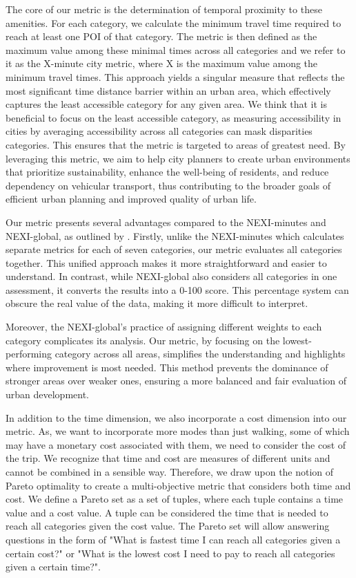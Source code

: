 The core of our metric is the determination of temporal proximity to these amenities. 
For each category, we calculate the minimum travel time required to reach at least one POI of that category. 
The metric is then defined as the maximum value among these minimal times across all categories and we refer to it as the X-minute city metric, where X is the maximum value among the minimum travel times.
This approach yields a singular measure that reflects the most significant time distance barrier within an urban area, which effectively captures the least accessible category for any given area.
We think that it is beneficial to focus on the least accessible category, as measuring accessibility in cities by averaging accessibility across all categories can mask disparities categories. 
This ensures that the metric is targeted to areas of greatest need. 
By leveraging this metric, we aim to help city planners to create urban environments that prioritize sustainability, enhance the well-being of residents, and reduce dependency on vehicular transport, thus contributing to the broader goals of efficient urban planning and improved quality of urban life.

Our metric presents several advantages compared to the NEXI-minutes and NEXI-global, as outlined by \cite{olivariAreItalianCities2023}.
Firstly, unlike the NEXI-minutes which calculates separate metrics for each of seven categories, our metric evaluates all categories together. 
This unified approach makes it more straightforward and easier to understand. 
In contrast, while NEXI-global also considers all categories in one assessment, it converts the results into a 0-100 score. 
This percentage system can obscure the real value of the data, making it more difficult to interpret.

Moreover, the NEXI-global's practice of assigning different weights to each category complicates its analysis. 
Our metric, by focusing on the lowest-performing category across all areas, simplifies the understanding and highlights where improvement is most needed. 
This method prevents the dominance of stronger areas over weaker ones, ensuring a more balanced and fair evaluation of urban development. 

In addition to the time dimension, we also incorporate a cost dimension into our metric.
As, we want to incorporate more modes than just walking, some of which may have a monetary cost associated with them, we need to consider the cost of the trip.
We recognize that time and cost are measures of different units and cannot be combined in a sensible way.
Therefore, we draw upon the notion of Pareto optimality to create a multi-objective metric that considers both time and cost.
We define a Pareto set as a set of tuples, where each tuple contains a time value and a cost value.
A tuple can be considered the time that is needed to reach all categories given the cost value.
The Pareto set will allow answering questions in the form of "What is fastest time I can reach all categories given a certain cost?" or "What is the lowest cost I need to pay to reach all categories given a certain time?".

